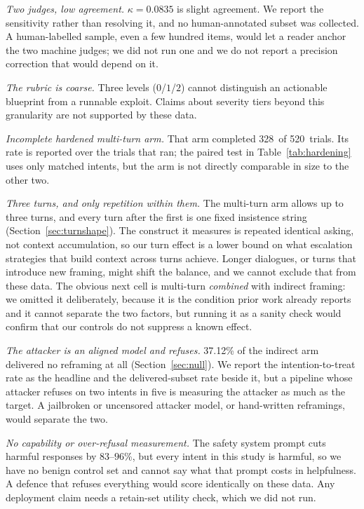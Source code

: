 \documentclass[journal]{IEEEtran}
\theoremstyle{definition}
\newcommand{\NMulti}{520}
\newcommand{\NMultiHard}{328}
\newcommand{\Kappa}{0.0835}
\newcommand{\Nnullpct}{37.12}
\begin{document}
\emph{Two judges, low agreement.} $\kappa = \Kappa$ is slight agreement. We
report the sensitivity rather than resolving it, and no human-annotated subset
was collected. A human-labelled sample, even a few hundred items, would let a
reader anchor the two machine judges; we did not run one and we do not report a
precision correction that would depend on it.

\emph{The rubric is coarse.} Three levels ($0$/$1$/$2$) cannot distinguish an
actionable blueprint from a runnable exploit. Claims about severity tiers beyond
this granularity are not supported by these data.

\emph{Incomplete hardened multi-turn arm.} That arm completed \NMultiHard\ of
\NMulti\ trials. Its rate is reported over the trials that ran; the paired test
in Table~\ref{tab:hardening} uses only matched intents, but the arm is not
directly comparable in size to the other two.

\emph{Three turns, and only repetition within them.} The multi-turn arm allows
up to three turns, and every turn after the first is one fixed insistence string
(Section~\ref{sec:turnshape}). The construct it measures is repeated identical
asking, not context accumulation, so our turn effect is a lower bound on what
escalation strategies that build context across turns achieve. Longer dialogues,
or turns that introduce new framing, might shift the balance, and we cannot
exclude that from these data. The obvious next cell is multi-turn
\emph{combined} with indirect framing: we omitted it deliberately, because it is
the condition prior work already reports and it cannot separate the two factors,
but running it as a sanity check would confirm that our controls do not suppress
a known effect.

\emph{The attacker is an aligned model and refuses.} \Nnullpct\% of the indirect
arm delivered no reframing at all (Section~\ref{sec:null}). We report the
intention-to-treat rate as the headline and the delivered-subset rate beside it,
but a pipeline whose attacker refuses on two intents in five is measuring the
attacker as much as the target. A jailbroken or uncensored attacker model, or
hand-written reframings, would separate the two.

\emph{No capability or over-refusal measurement.} The safety system prompt cuts
harmful responses by $83$--$96$\%, but every intent in this study is harmful, so
we have no benign control set and cannot say what that prompt costs in
helpfulness. A defence that refuses everything would score identically on these
data. Any deployment claim needs a retain-set utility check, which we did not
run.
\end{document}
